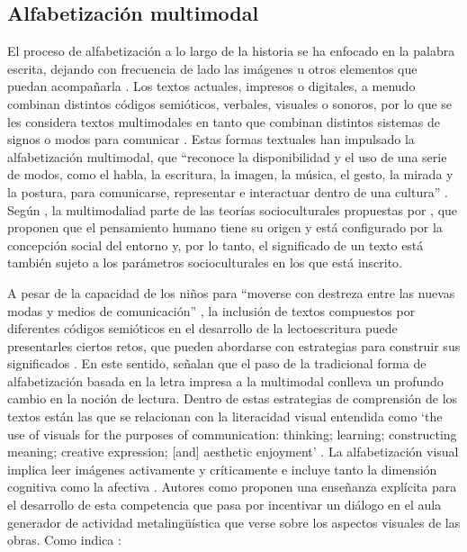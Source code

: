 \documentclass[spanish]{textolivre}
\begin{document}
\subsection{Alfabetización multimodal}\label{sec-formato}
El proceso de alfabetización a lo largo de la historia se ha enfocado en la palabra escrita, dejando con frecuencia de lado las imágenes u otros elementos que puedan acompañarla \cite{serafini_reading_2012}. Los textos actuales, impresos o digitales, a menudo combinan distintos códigos semióticos, verbales, visuales o sonoros, por lo que se les considera textos multimodales en tanto que combinan distintos sistemas de signos o modos para comunicar \cite{kress_partnerships_2011}. Estas formas textuales han impulsado la alfabetización multimodal, que “reconoce la disponibilidad y el uso de una serie de modos, como el habla, la escritura, la imagen, la música, el gesto, la mirada y la postura,  para comunicarse, representar e interactuar dentro de una cultura” \cite[p. 24, Traducción de las autoras]{jewitt_introduction_2009}. Según \textcite{pantaleo_primary_2016-1}, la multimodaliad parte de las teorías socioculturales propuestas por \textcite{vygotsky_mind_1978}, que proponen que el pensamiento humano tiene su origen y está configurado por la concepción social del entorno y, por lo tanto, el significado de un texto está también sujeto a los parámetros socioculturales en los que está inscrito.

A pesar de la capacidad de los niños para “moverse con destreza entre las nuevas modas y medios de comunicación” \cite[p. 92]{gonzalez_garcia_enfoque_2018}, la inclusión de textos compuestos por diferentes códigos semióticos en el desarrollo de la lectoescritura puede presentarles ciertos retos, que pueden abordarse con estrategias para construir sus significados \cite{serafini_multimodal_2015,siegel_rereading_2006}. En este sentido, \textcite[p. 270]{hassett_theories_2009} señalan que el paso de la tradicional forma de alfabetización basada en la letra impresa a la multimodal conlleva un profundo cambio en la noción de lectura. Dentro de estas estrategias de comprensión de los textos están las que se relacionan con la literacidad visual entendida como ‘the use of visuals for the purposes of communication: thinking; learning; constructing meaning; creative expression; [and] aesthetic enjoyment’ \cite[p. 284]{avgerinou_review_1997}. La alfabetización visual implica leer imágenes activamente y críticamente \cite{korda_learning_2016} e incluye tanto la dimensión cognitiva como la afectiva \cite{avgerinou_review_1997,pantaleo_language_2015a}. Autores como \textcite{arizpe_critical_2008,walsh_reading_2007,pantaleo_primary_2015b} proponen una enseñanza explícita para el desarrollo de esta competencia que pasa por incentivar un diálogo en el aula generador de actividad metalingüística que verse sobre los aspectos visuales de las obras. Como indica \textcite[p. 2]{callow_talking_2003}:
\end{document}
